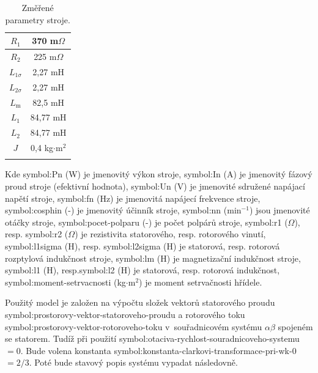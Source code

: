 \documentclass[a4paper, twoside, 11pt]{article}
\begin{document}
        \begin{minipage}[t]{0.47\textwidth}
            \vspace{0pt}
            \begin{table}[H]
                \caption{Změřené parametry stroje.}
                \centering
                    \begin{tabular}{!{\vrule width 2pt} c | c !{\vrule width 2pt}}
                        $R_\text{1}$ & 370 m$\Omega$ \\ \hline
                        $R_\text{2}$ & 225 m$\Omega$ \\ \hline
                        $L_{1\sigma}$ & 2,27 mH \\ \hline
                        $L_{2\sigma}$ & 2,27 mH \\ \hline
                        $L_\text{m}$ & 82,5 mH \\ \hline
                        $L_{1}$ & 84,77 mH \\ \hline
                        $L_{2}$ & 84,77 mH \\ \hline $J$ & 0,4 kg$\cdot$m$^{2}$ \\ 
                    \end{tabular}     
                \label{tab:motor-zmerene-parametry-stroje}
            \end{table}
        \end{minipage}

        \vspace*{1cm}
Kde \gls{symbol:Pn} (W) je jmenovitý výkon stroje, \gls{symbol:In} (A) je jmenovitý fázový proud stroje (efektivní hodnota), \gls{symbol:Un} (V) je jmenovité sdružené napájací napětí stroje, \gls{symbol:fn} (Hz) je jmenovitá napájecí frekvence stroje, \gls{symbol:cosphin} (-) je jmenovitý účinník stroje, \gls{symbol:nn} (min$^{-1}$) jsou jmenovité otáčky stroje, \gls{symbol:pocet-polparu} (-) je počet polpárů stroje, \gls{symbol:r1} ($\Omega$), resp. \gls{symbol:r2} ($\Omega$) je rezistivita statorového, resp. rotorového vinutí, \gls{symbol:l1sigma} (H), resp. \gls{symbol:l2sigma} (H) je statorová, resp. rotorová rozptylová  indukčnost stroje, \gls{symbol:lm} (H) je magnetizační indukčnost stroje, \gls{symbol:l1} (H), resp.\gls{symbol:l2} (H) je statorová, resp. rotorová indukčnost, \gls{symbol:moment-setrvacnosti} (kg$\cdot$m$^{2}$) je moment setrvačnosti hřídele.\par
Použitý model je založen na výpočtu složek vektorů statorového proudu \gls{symbol:prostorovy-vektor-statoroveho-proudu} a rotorového toku \gls{symbol:prostorovy-vektor-rotoroveho-toku} v~souřadnicovém systému $\alpha\beta$ spojeném se statorem. Tudíž při použití \gls{symbol:otaciva-rychlost-souradnicoveho-systemu}~$= 0$. Bude volena konstanta \gls{symbol:konstanta-clarkovi-transformace-pri-wk-0}~$= 2/3$. Poté bude stavový popis systému vypadat následovně.
\end{document}
